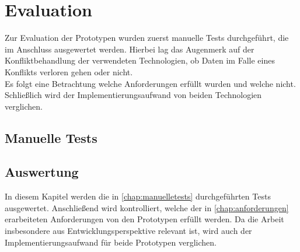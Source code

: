 \chapter{\label{chap:evaluation}Evaluation}
Zur Evaluation der Prototypen wurden zuerst manuelle Tests durchgeführt, die im Anschluss ausgewertet werden. 
Hierbei lag das Augenmerk auf der Konfliktbehandlung der verwendeten Technologien, ob Daten im Falle eines Konflikts verloren gehen oder nicht.\\
Es folgt eine Betrachtung welche Anforderungen erfüllt wurden und welche nicht.
Schließlich wird der Implementierungsaufwand von beiden Technologien verglichen.
%
%
\section{\label{chap:manuelletests}Manuelle Tests}

%
%
\section{\label{chap:auswertung}Auswertung}
In diesem Kapitel werden die in \autoref{chap:manuelletests} durchgeführten Tests ausgewertet.
Anschließend wird kontrolliert, welche der in \autoref{chap:anforderungen} erarbeiteten Anforderungen von den Prototypen erfüllt werden.
Da die Arbeit insbesondere aus Entwicklungsperspektive relevant ist, wird auch der Implementierungsaufwand für beide Prototypen verglichen.
